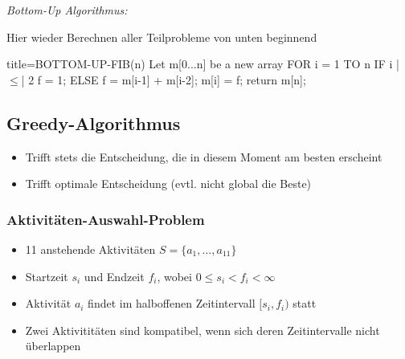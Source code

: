 \documentclass[
    ngerman,
    color=3b,
    dark_mode,
    load_common, %
    summary,
    boxarc,
]{tuda_summary}
\begin{document}
\textit{Bottom-Up Algorithmus:}

Hier wieder Berechnen aller Teilprobleme von unten beginnend

                            \begin{codeBlock}[autogobble,escapeinside=||]{title={BOTTOM-UP-FIB(n)}}
                            Let m[0...n] be a new array
                            FOR i = 1 TO n
                                IF i |$\leq$| 2
                                    f = 1;
                                ELSE
                                    f = m[i-1] + m[i-2];
                                m[i] = f;
                            return m[n];
                            \end{codeBlock}


\clearpage
\subsection{Greedy-Algorithmus}
\begin{idea}\mbox{}
    \begin{itemize}
        \item Trifft stets die Entscheidung, die in diesem Moment am besten erscheint
        \item Trifft  optimale Entscheidung (evtl. nicht global die Beste)
    \end{itemize}
\end{idea}

\subsubsection{Aktivitäten-Auswahl-Problem}
\begin{definition}\mbox{}
    \begin{itemize}
        \item 11 anstehende Aktivitäten $S=\{a_1,...,a_{11}\}$
        \item Startzeit $s_i$ und Endzeit $f_i$, wobei $0 \leq s_i < f_i < \infty$
        \item Aktivität $a_i$ findet im halboffenen Zeitintervall $[s_i,f_i)$ statt
        \item Zwei Aktivititäten sind kompatibel, wenn sich deren Zeitintervalle nicht überlappen
    \end{itemize}
\end{definition}
\end{document}
